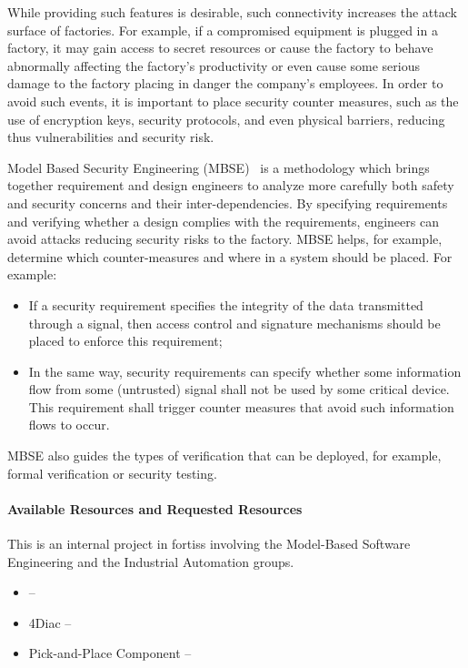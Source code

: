 While providing such features is desirable, such connectivity increases the attack surface of factories. For example, if a compromised equipment is plugged in a factory, it may gain access to secret resources or cause the factory to behave abnormally affecting the factory's productivity or even cause some serious damage to the factory placing in danger the company's employees. In order to avoid such events, it is important to place security counter measures, such as the use of encryption keys, security protocols, and even physical barriers, reducing thus vulnerabilities and security risk. 

Model Based Security Engineering (MBSE)~\cite{umlsec,casesec} is a methodology which brings together requirement and design engineers to analyze more carefully both safety and security concerns and their inter-dependencies. By specifying requirements and verifying whether a design complies with the requirements, engineers can avoid attacks reducing security risks to the factory. MBSE helps, for example, determine which counter-measures and where in a system should be placed. For example:
\begin{itemize}
  \item If a security requirement specifies the integrity of the data transmitted through a signal, then  access control and signature mechanisms should be placed to enforce this requirement;

  \item In the same way, security requirements can specify whether some information flow from some (untrusted) signal shall not be used by some critical device. This requirement shall trigger counter measures that avoid such information flows to occur.
\end{itemize}
 MBSE also guides the types of verification that can be deployed, for example, formal verification or security testing.


\paragraph{Available Resources and Requested Resources} 
This is an internal project in fortiss involving the Model-Based Software Engineering and the Industrial Automation groups. 
\begin{itemize}
  \item \autofocus -- 
  \item 4Diac -- 
  \item Pick-and-Place Component --
\end{itemize}
  
